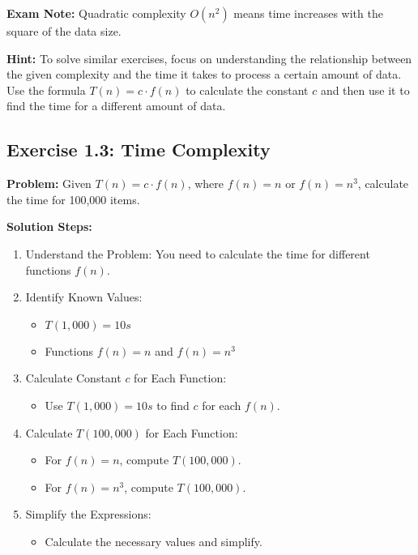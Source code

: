 \textbf{Exam Note:} Quadratic complexity $O(n^2)$ means time increases with the square of the data size.

\textbf{Hint:} To solve similar exercises, focus on understanding the relationship between the given complexity and the time it takes to process a certain amount of data. Use the formula $T(n) = c \cdot f(n)$ to calculate the constant $c$ and then use it to find the time for a different amount of data.

\subsection{Exercise 1.3: Time Complexity}
\textbf{Problem:} Given $T(n) = c \cdot f(n)$, where $f(n) = n$ or $f(n) = n^3$, calculate the time for 100,000 items.

\vspace{0.5em}
\textbf{Solution Steps:}
\begin{enumerate}[leftmargin=*,noitemsep]
    \item Understand the Problem: You need to calculate the time for different functions $f(n)$.
    \item Identify Known Values:
    \begin{itemize}
        \item $T(1,000) = 10s$
        \item Functions $f(n) = n$ and $f(n) = n^3$
    \end{itemize}
    \item Calculate Constant $c$ for Each Function:
    \begin{itemize}
        \item Use $T(1,000) = 10s$ to find $c$ for each $f(n)$.
    \end{itemize}
    \item Calculate $T(100,000)$ for Each Function:
    \begin{itemize}
        \item For $f(n) = n$, compute $T(100,000)$.
        \item For $f(n) = n^3$, compute $T(100,000)$.
    \end{itemize}
    \item Simplify the Expressions:
    \begin{itemize}
        \item Calculate the necessary values and simplify.
    \end{itemize}
\end{enumerate}

